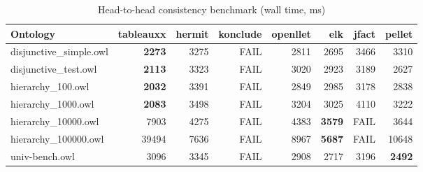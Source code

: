 \begin{table}[t]
\centering
\caption{Head-to-head consistency benchmark (wall time, ms)}
\label{tab:head_to_head_wall_ms}
\begin{tabular}{lrrrrrrr}
\toprule
Ontology & tableauxx & hermit & konclude & openllet & elk & jfact & pellet \\
\midrule
disjunctive\_simple.owl & \textbf{2273} & 3275 & FAIL & 2811 & 2695 & 3466 & 3310 \\
disjunctive\_test.owl & \textbf{2113} & 3323 & FAIL & 3020 & 2923 & 3189 & 2627 \\
hierarchy\_100.owl & \textbf{2032} & 3391 & FAIL & 2849 & 2985 & 3178 & 2838 \\
hierarchy\_1000.owl & \textbf{2083} & 3498 & FAIL & 3204 & 3025 & 4110 & 3222 \\
hierarchy\_10000.owl & 7903 & 4275 & FAIL & 4383 & \textbf{3579} & FAIL & 3644 \\
hierarchy\_100000.owl & 39494 & 7636 & FAIL & 8967 & \textbf{5687} & FAIL & 10648 \\
univ-bench.owl & 3096 & 3345 & FAIL & 2908 & 2717 & 3196 & \textbf{2492} \\
\bottomrule
\end{tabular}
\end{table}
